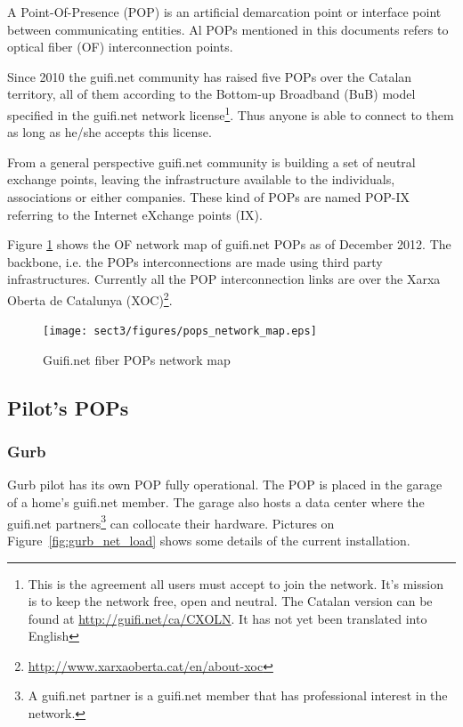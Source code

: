 A Point-Of-Presence (POP) is an artificial demarcation point or interface point between communicating entities. Al POPs mentioned in this documents refers to optical fiber (OF) interconnection points.

Since 2010 the guifi.net community has raised five POPs over the Catalan territory, all of them according to the Bottom-up Broadband (BuB) model specified in the guifi.net network license\footnote{This is the agreement all users must accept to join the network. It's mission is to keep the network free, open and neutral. The Catalan version can be found at \url{http://guifi.net/ca/CXOLN}. It has not yet been translated into English}.
Thus anyone is able to connect to them as long as he/she accepts this license.

From a general perspective guifi.net community is building a set of neutral exchange points, leaving the infrastructure available to the individuals, associations or either companies. These kind of POPs are named POP-IX referring to the Internet eXchange points (IX).

Figure \ref{fig:fibre_map} shows the OF network map of guifi.net POPs as of December 2012. The backbone, i.e. the POPs interconnections are made using third party infrastructures. Currently all the POP interconnection links are over the Xarxa Oberta de Catalunya (XOC)\footnote{\url{http://www.xarxaoberta.cat/en/about-xoc}}.

\begin{figure}[htbp]
  \centering
  \texttt{[image: sect3/figures/pops\_network\_map.eps]} 
  \caption{Guifi.net fiber POPs network map}
  \label{fig:fibre_map}
\end{figure}


\FloatBarrier
\subsection{Pilot's POPs}

\FloatBarrier
\subsubsection{Gurb}
Gurb pilot has its own POP fully operational. The POP is placed in the garage of a home's guifi.net member. The garage also hosts a data center where the guifi.net partners\footnote{A guifi.net partner is a guifi.net member that has professional interest in the network.} can collocate their hardware. Pictures on Figure~\ref{fig:gurb_net_load} shows some details of the current installation.


